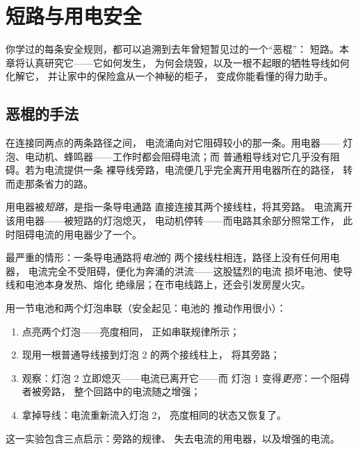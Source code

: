 \chapter{短路与用电安全}\label{ch:g7:short-circuits-safety}

你学过的每条安全规则，都可以追溯到去年曾短暂见过的一个“恶棍”：
短路。本章将认真研究它——它如何发生，
为何会烧毁，以及一根不起眼的牺牲导线如何化解它，
并让家中的保险盒从一个神秘的柜子，
变成你能看懂的得力助手。

\section{恶棍的手法}

\begin{proposition}[电流偏爱省力的路径]\label{prop:g7:short-circuits-safety:effortless}
在连接同两点的两条路径之间，
电流涌向对它阻碍较小的那一条。用电器——
灯泡、电动机、蜂鸣器——工作时都会阻碍电流；而
普通粗导线对它几乎没有阻碍。若为电流提供一条
裸导线旁路，电流便几乎完全离开用电器所在的路径，
转而走那条省力的路。
\end{proposition}

\begin{definition}[用电器的短路]\label{def:g7:short-circuits-safety:device}
用电器被\emph{短路}，是指一条导电通路
直接连接其两个接线柱，将其旁路。
电流离开该用电器——被短路的灯泡熄灭，
电动机停转——而电路其余部分照常工作，
此时阻碍电流的用电器少了一个。
\end{definition}

\begin{definition}[电池的短路]\label{def:g7:short-circuits-safety:battery}
最严重的情形：一条导电通路将\emph{电池}的
两个接线柱相连，路径上没有任何用电器，
电流完全不受阻碍，便化为奔涌的洪流——这股猛烈的电流
损坏电池、使导线和电池本身发热、熔化
绝缘层；在市电线路上，还会引发房屋火灾。
\end{definition}

\begin{method}[安全地演示这位“恶棍”]\label{met:g7:short-circuits-safety:demo}
用一节电池和两个灯泡串联（安全起见：电池的
推动作用很小）：
\begin{enumerate}
  \item 点亮两个灯泡——亮度相同，
        正如串联规律所示；
  \item 现用一根普通导线接到灯泡 2 的两个接线柱上，
        将其旁路；
  \item 观察：灯泡 2 立即熄灭——电流已离开它——而
        灯泡 1 变得\emph{更亮}：一个阻碍者被旁路，
        整个回路中的电流随之增强；
  \item 拿掉导线：电流重新流入灯泡 2，
        亮度相同的状态又恢复了。
\end{enumerate}
这一实验包含三点启示：旁路的规律、
失去电流的用电器，以及增强的电流。
\end{method}

